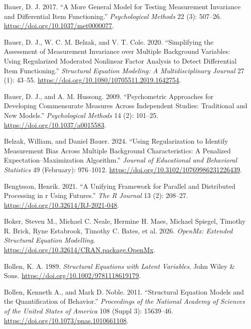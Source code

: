 \documentclass[
  man,
  floatsintext]{apa7}
\newlength{\cslhangindent}
\newenvironment{CSLReferences}[2] %
 {\begin{list}{}{%
  \setlength{\itemindent}{0pt}
  \setlength{\leftmargin}{0pt}
  \setlength{\parsep}{0pt}
  \ifodd #1
   \setlength{\leftmargin}{\cslhangindent}
   \setlength{\itemindent}{-1\cslhangindent}
  \fi
  \setlength{\itemsep}{#2\baselineskip}}}
 {\end{list}}
\begin{document}
\label{refs}
\begin{CSLReferences}{1}{0}
Bauer, D. J. 2017. {``A More General Model for Testing Measurement
Invariance and Differential Item Functioning.''} \emph{Psychological
Methods} 22 (3): 507--26. \url{https://doi.org/10.1037/met0000077}.

Bauer, D. J., W. C. M. Belzak, and V. T. Cole. 2020. {``Simplifying the
Assessment of Measurement Invariance over Multiple Background Variables:
Using Regularized Moderated Nonlinear Factor Analysis to Detect
Differential Item Functioning.''} \emph{Structural Equation Modeling: A
Multidisciplinary Journal} 27 (1): 43--55.
\url{https://doi.org/10.1080/10705511.2019.1642754}.

Bauer, D. J., and A. M. Hussong. 2009. {``Psychometric Approaches for
Developing Commensurate Measures Across Independent Studies: Traditional
and New Models.''} \emph{Psychological Methods} 14 (2): 101--25.
\url{https://doi.org/10.1037/a0015583}.

Belzak, William, and Daniel Bauer. 2024. {``Using Regularization to
Identify Measurement Bias Across Multiple Background Characteristics: A
Penalized Expectation--Maximization Algorithm.''} \emph{Journal of
Educational and Behavioral Statistics} 49 (February): 976--1012.
\url{https://doi.org/10.3102/10769986231226439}.

Bengtsson, Henrik. 2021. {``A Unifying Framework for Parallel and
Distributed Processing in r Using Futures.''} \emph{The R Journal} 13
(2): 208--27. \url{https://doi.org/10.32614/RJ-2021-048}.

Boker, Steven M., Michael C. Neale, Hermine H. Maes, Michael Spiegel,
Timothy R. Brick, Ryne Estabrook, Timothy C. Bates, et al. 2026.
\emph{OpenMx: Extended Structural Equation Modelling}.
\url{https://doi.org/10.32614/CRAN.package.OpenMx}.

Bollen, K. A. 1989. \emph{Structural Equations with Latent Variables}.
John Wiley \& Sons. \url{https://doi.org/10.1002/9781118619179}.

Bollen, Kenneth A., and Mark D. Noble. 2011. {``{Structural Equation
Models and the Quantification of Behavior}.''} \emph{Proceedings of the
National Academy of Sciences of the United States of America} 108 (Suppl
3): 15639--46. \url{https://doi.org/10.1073/pnas.1010661108}.


\end{CSLReferences}
\end{document}

